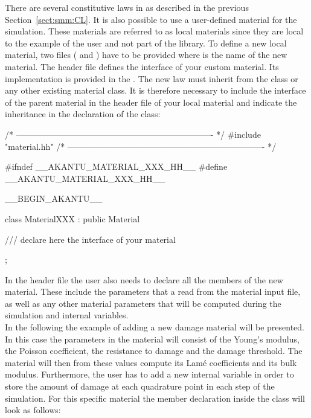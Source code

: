 There are several constitutive laws in \akantu as described in the
previous Section~\ref{sect:smm:CL}. It is also possible to use a
user-defined material for the simulation. These materials are referred
to as local materials since they are local to the example of the user
and not part of the \akantu library.  To define a new local material,
two files ( and ) have
to be provided where  is the name of the new material. The
header file  defines the interface of your
custom material. Its implementation is provided in the
. The new law must inherit from the
 class or any other existing material class. It is
therefore necessary to include the interface of the parent material
in the header file of your local material and indicate the inheritance
in the declaration of the class:
\begin{cpp}
/* ---------------------------------------------------------------------- */
#include "material.hh"
/* ---------------------------------------------------------------------- */

#ifndef __AKANTU_MATERIAL_XXX_HH__
#define __AKANTU_MATERIAL_XXX_HH__

__BEGIN_AKANTU__

class MaterialXXX : public Material {

/// declare here the interface of your material

};
\end{cpp}
In the header file the user also needs to declare all the members of the new
material. These include the parameters that a read from the
material input file, as well as any other material parameters that will be computed during the simulation and internal variables.\\
In the following the example of adding a new damage material will be presented. In this
case the parameters in the material will consist of the Young's modulus, the
Poisson coefficient, the resistance to damage and the damage threshold. The
material will then from these values compute its Lam\'{e} coefficients and its
bulk modulus. Furthermore, the user has to add a new internal variable
 in order to store the amount of damage at each quadrature point in
each step of the simulation. For this specific material the member declaration
inside the class will look as follows:
